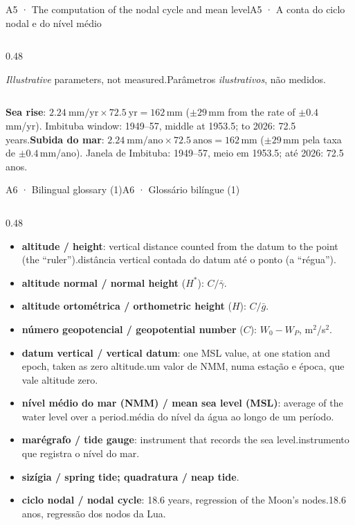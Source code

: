 \documentclass[aspectratio=169,11pt]{beamer}
\newcommand{\tr}[2]{\ifEN#2\else#1\fi}
\begin{document}
\begin{frame}{\tr{A5 · A conta do ciclo nodal e do nível médio}{A5 · The computation of the nodal cycle and mean level}}
\begin{columns}[onlytextwidth]
\begin{column}{0.48\textwidth}
\begin{tcolorbox}[colback=mIndigo!8, colframe=mIndigo, title={\tr{Quanto tempo de média? (simulação)}{How long to average? (simulation)}}]
        \tr{Parâmetros \emph{ilustrativos}, não medidos.}{\emph{Illustrative} parameters, not measured.}
      \end{tcolorbox}
    \end{column}
  \end{columns}
  \medskip
  \tr{\textbf{Subida do mar}: $\num{2.24}\ \mathrm{mm/ano}\times\num{72.5}\ \mathrm{anos}=\num{162}$\,mm ($\pm\num{29}$\,mm pela taxa de $\pm\num{0.4}$\,mm/ano). Janela de Imbituba: 1949--57, meio em \num{1953.5}; até 2026: \num{72.5} anos.}{\textbf{Sea rise}: $\num{2.24}\ \mathrm{mm/yr}\times\num{72.5}\ \mathrm{yr}=\num{162}$\,mm ($\pm\num{29}$\,mm from the rate of $\pm\num{0.4}$\,mm/yr). Imbituba window: 1949--57, middle at \num{1953.5}; to 2026: \num{72.5} years.}
\end{frame}

\begin{frame}{\tr{A6 · Glossário bilíngue (1)}{A6 · Bilingual glossary (1)}}
  \tiny
  \begin{columns}[onlytextwidth]
    \begin{column}{0.48\textwidth}
      \begin{itemize}
        \setlength{\itemsep}{2pt}
        \item \textbf{altitude / height}: \tr{distância vertical contada do datum até o ponto (a ``régua'').}{vertical distance counted from the datum to the point (the ``ruler'').}
        \item \textbf{altitude normal / normal height} ($H^{*}$): $C/\bar\gamma$.
        \item \textbf{altitude ortométrica / orthometric height} ($H$): $C/\bar g$.
        \item \textbf{número geopotencial / geopotential number} ($C$): $W_0-W_P$, m$^{2}$/s$^{2}$.
        \item \textbf{datum vertical / vertical datum}: \tr{um valor de NMM, numa estação e época, que vale altitude zero.}{one MSL value, at one station and epoch, taken as zero altitude.}
        \item \textbf{nível médio do mar (NMM) / mean sea level (MSL)}: \tr{média do nível da água ao longo de um período.}{average of the water level over a period.}
        \item \textbf{marégrafo / tide gauge}: \tr{instrumento que registra o nível do mar.}{instrument that records the sea level.}
        \item \textbf{sizígia / spring tide; quadratura / neap tide}.
        \item \textbf{ciclo nodal / nodal cycle}: \tr{\num{18.6} anos, regressão dos nodos da Lua.}{\num{18.6} years, regression of the Moon's nodes.}

\end{itemize}
\end{column}
\end{columns}
\end{frame}
\end{document}
